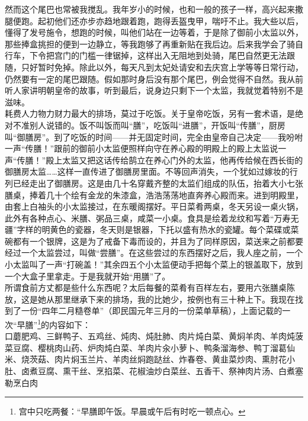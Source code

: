 然而这个尾巴也常被我搅乱。我年岁小的时候，也和一般的孩子一样，高兴起来撒腿便跑。起初他们还亦步亦趋地跟着跑，跑得丢盔曳甲，喘吁不止。我大些以后，懂得了发号施令，想跑的时候，叫他们站在一边等着，于是除了御前小太监以外，那些捧盒挑担的便到一边静立，等我跑够了再重新贴在我后边。后来我学会了骑自行车，下令把宫门的门槛一律锯掉，这样出入无阻地到处骑，尾巴自然更无法跟随，只好暂时免掉。除此以外，每天凡到太妃处请安和去庆宫上学等等日常行动，仍然要有一定的尾巴跟随。假如那时身后没有那个尾巴，例会觉得不自然。我从前听人家讲明朝皇帝的故事，听到最后，说身边只剩下一个太监，我就觉着特别不是滋味。\\

耗费人力物力财力最大的排场，莫过于吃饭。关于皇帝吃饭，另有一套术语，是绝对不准别人说错的。饭不叫饭而叫“膳”，吃饭叫“进膳”，开饭叫“传膳”，厨房叫“御膳房”。到了吃饭的时间——并无固定时间，完全由皇帝自己决定——我吩咐一声“传膳！”跟前的御前小太监便照样向守在养心殿的明殿上的殿上太监说一声“传膳！”殿上太监又把这话传给鹄立在养心门外的太监，他再传给候在西长街的御膳房太监……这样一直传进了御膳房里面。不等回声消失，一个犹如过嫁妆的行列已经走出了御膳房。这是由几十名穿戴齐整的太监们组成的队伍，抬着大小七张膳桌，捧着几十个绘有金龙的朱漆盒，浩浩荡荡地直奔养心殿而来。进到明殿里，由套上白袖头的小太监接过，在东暖阁摆好。平日菜肴两桌，冬天另设一桌火锅，此外有各种点心、米膳、粥品三桌，咸菜一小桌。食具是绘着龙纹和写着“万寿无疆”字样的明黄色的瓷器，冬天则是银器，下托以盛有热水的瓷罐。每个菜碟或菜碗都有一个银牌，这是为了戒备下毒而设的，并且为了同样原因，菜送来之前都要经过一个太监尝过，叫做“尝膳”。在这些尝过的东西摆好之后，我人座之前，一个小太监叫了一声“打碗盖！”其余四五个小太监便动手把每个菜上的银盖取下，放到一个大盒子里拿走。于是我就开始“用膳”了。\\

所谓食前方丈都是些什么东西呢？太后每餐的菜肴有百样左右，要用六张膳桌陈放，这是她从那里继承下来的排场，我的比她少，按例也有三十种上下。我现在找到了一份“四年二月糙卷单”（即民国元年三月的一份菜单草稿），上面记载的一次“早膳”\footnote{宫中只吃两餐：“早膳即午饭。早晨或午后有时吃一顿点心。}的内容如下：\\

口蘑肥鸡、三鲜鸭子、五鸡丝、炖肉、炖肚肺、肉片炖白菜、黄焖羊肉、羊肉炖菠菜豆腐、樱桃肉山药、炉肉炖白菜、羊肉片汆小萝卜、鸭条溜海参、鸭丁溜葛仙米、烧茨菇、肉片焖玉兰片、羊肉丝焖跑跶丝、炸春卷、黄韭菜炒肉、熏肘花小肚、卤煮豆腐、熏干丝、烹掐菜、花椒油炒白菜丝、五香干、祭神肉片汤、白煮塞勒烹白肉\\

